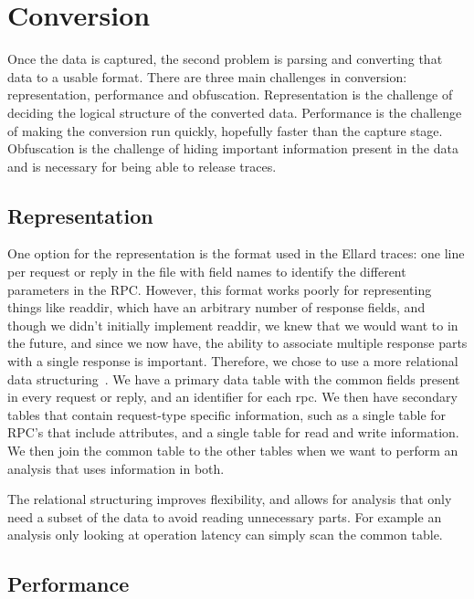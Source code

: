 \section{Conversion}
\label{sec:conversion}

Once the data is captured, the second problem is parsing and
converting that data to a usable format.  There are three main
challenges in conversion: representation, performance and obfuscation.
Representation is the challenge of deciding the logical structure of
the converted data.  Performance is the challenge of making the
conversion run quickly, hopefully faster than the capture stage.
Obfuscation is the challenge of hiding important information present
in the data and is necessary for being able to release traces.


\subsection{Representation}

One option for the representation is the format used in the
Ellard\cite{ellardTraces} traces: one line per request or reply in the
file with field names to identify the different parameters in the RPC.
However, this format works poorly for representing things like
readdir, which have an arbitrary number of response fields, and though
we didn't initially implement readdir, we knew that we would want to
in the future, and since we now have, the ability to associate
multiple response parts with a single response is important.
Therefore, we chose to use a more relational data
structuring~\cite{codd70relational}.  We have a primary data table
with the common fields present in every request or reply, and an
identifier for each rpc.  We then have secondary tables that contain
request-type specific information, such as a single table for RPC's
that include attributes, and a single table for read and write
information.  We then join the common table to the other tables when
we want to perform an analysis that uses information in both.

The relational structuring improves flexibility, and allows for
analysis that only need a subset of the data to avoid reading
unnecessary parts.  For example an analysis only looking at operation
latency can simply scan the common table.

\subsection{Performance}

